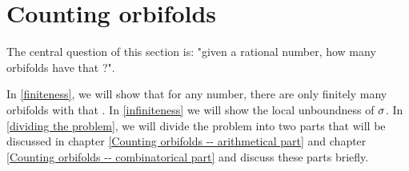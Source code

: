 \chapter{Counting orbifolds} \label{counting occurrences}

The central question of this section is: "given a rational number, how many orbifolds 
have that \Eoc ?". 

In \ref{finiteness}, we will show that for any number, there are only finitely many 
orbifolds with that \Eoc. 
In \ref{infiniteness} we will show the local unboundness of ${\sigma}$. 
In \ref{dividing the problem}, we will divide the problem into two parts 
that will be discussed in chapter 
\ref{Counting orbifolds -- arithmetical part} and chapter 
\ref{Counting orbifolds -- combinatorical part} and discuss these parts briefly. 

